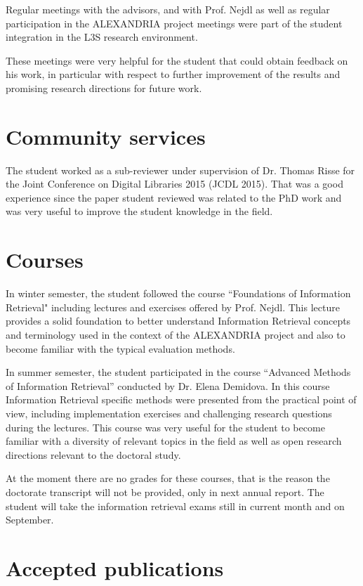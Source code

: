 \documentclass[a4paper,11pt]{report}
\begin{document}
Regular meetings with the advisors, and with Prof. Nejdl
as well as regular participation in the ALEXANDRIA project meetings were part
of the student integration in the L3S research environment.

These meetings were very helpful for the student that could obtain feedback on
his work, in particular with respect to further improvement of the results and promising research directions for future work.

\section{Community services}

The student worked as a sub-reviewer under supervision of Dr. Thomas Risse for the 
Joint Conference on Digital Libraries 2015 (JCDL 2015). That was a good experience since
the paper student reviewed was related to the PhD work and was
very useful to improve the student knowledge in the field.

\section{Courses}

In winter semester, the student followed the course ``Foundations of Information Retrieval"
including lectures and exercises offered by Prof. Nejdl. This lecture provides a solid 
foundation to better understand Information Retrieval concepts and terminology
used in the context of the ALEXANDRIA project and also to become familiar with the  
typical evaluation methods. 

In summer semester, the student participated in the course 
``Advanced Methods of Information Retrieval'' conducted by Dr. Elena Demidova. In this course
Information Retrieval specific methods were presented from the practical point of view, 
including implementation exercises and challenging research questions during the lectures.
This course was very useful for the student to become familiar with a diversity
of relevant topics in the field as well as open research directions relevant to the doctoral
study.

At the moment there are no grades for these courses, that is the reason the
doctorate transcript will not be provided, only in next annual report. The
student will take the information retrieval exams still in current month and
on September.
\section{Accepted publications}
\end{document}
